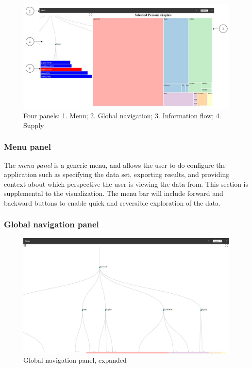 \documentclass{soups}
\begin{document}
\begin{figure}
  \centering
  \includegraphics[width=\columnwidth]{pics/whole_app_numbers.jpg}
  \caption[All panels]{Four panels: 1. Menu; 2. Global navigation; 3. Information flow; 4. Supply}
  \label{fig:allpanels}
\end{figure}

\subsubsection{Menu panel}

The \emph{menu panel} is a generic menu, and allows the user to do configure the application such as specifying the data set, exporting results, and providing context about which perspective the user is viewing the data from. This section is supplemental to the visualization. The menu bar will include forward and backward buttons to enable quick and reversible exploration of the data.

\subsubsection{Global navigation panel}

\begin{figure}
  \centering
  \includegraphics[width=\columnwidth]{pics/expanded_app.jpg}
  \caption{Global navigation panel, expanded}
  \label{fig:global}
\end{figure}
\end{document}
